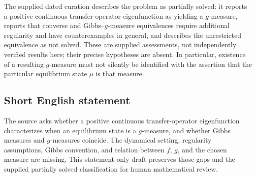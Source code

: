 \documentclass[11pt]{article}
\begin{document}
The supplied dated curation describes the problem as partially solved: it reports a positive continuous transfer-operator eigenfunction as yielding a \(g\)-measure, reports that converse and Gibbs--\(g\)-measure equivalences require additional regularity and have counterexamples in general, and describes the unrestricted equivalence as not solved. These are supplied assessments, not independently verified results here; their precise hypotheses are absent. In particular, existence of a resulting \(g\)-measure must not silently be identified with the assertion that the particular equilibrium state \(\mu\) is that measure.
\subsection{Short English statement}
The source asks whether a positive continuous transfer-operator eigenfunction characterizes when an equilibrium state is a \(g\)-measure, and whether Gibbs measures and \(g\)-measures coincide. The dynamical setting, regularity assumptions, Gibbs convention, and relation between \(f\), \(g\), and the chosen measure are missing. This statement-only draft preserves those gaps and the supplied partially solved classification for human mathematical review.
\end{document}

